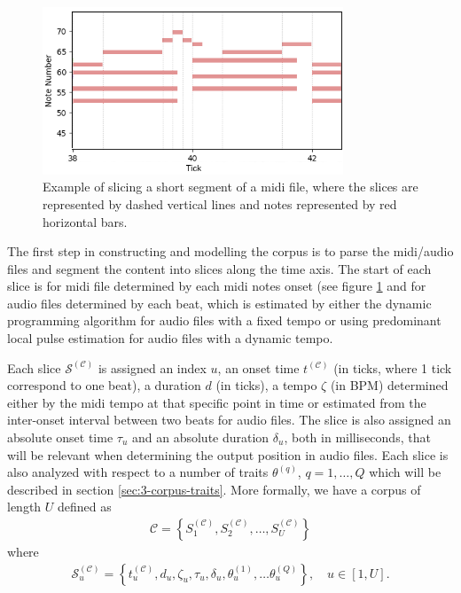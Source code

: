  \begin{figure}[h!]
    \centering        
 	\includegraphics[width=0.8\textwidth]{figures/3-slicing.png}
    \caption{Example of slicing a short segment of a midi file, where the slices are represented by dashed vertical lines and notes represented by red horizontal bars.}
    \label{fig:3-slicing}
\end{figure}

\noindent The first step in constructing and modelling the corpus is to parse the midi/audio files and segment the content into slices along the time axis. The start of each slice is for midi file determined by each midi notes onset (see figure \ref{fig:3-slicing} and for audio files determined by each beat, which is estimated by either the dynamic programming algorithm \cite{ellis_beat_2007} for audio files with a fixed tempo or using predominant local pulse estimation \cite{plp_2010} for audio files with a dynamic tempo.

Each slice $\mathcal S^{(\mathcal C)}$ is assigned an index $u$, an onset time $t^{(\mathcal C)}$ (in ticks, where 1 tick correspond to one beat), a duration $d$ (in ticks), a tempo $\zeta$ (in BPM) determined either by the midi tempo at that specific point in time or estimated from the inter-onset interval between two beats for audio files. The slice is also assigned an absolute onset time $\tau_u$ and an absolute duration $\delta_u$, both in milliseconds, that will be relevant when determining the output position in audio files. Each slice is also analyzed with respect to a number of traits $\theta^{(q)}$, $q = 1,\dots,Q$ which will be described in section \ref{sec:3-corpus-traits}. More formally, we have a corpus of length $U$ defined as 
\begin{align}
	\mathcal C = \left\lbrace S_1^{(\mathcal C)}, S_2^{(\mathcal C)}, \dots, S_U^{(\mathcal C)} \right\rbrace
 \end{align}
 where \begin{align}\label{eq:3-slice-definition}
 	\mathcal S_u^{(\mathcal C)} = \left\lbrace t_u^{(\mathcal C)}, d_u, \zeta_u, \tau_u, \delta_u, \theta_u^{(1)},\dots\theta_u^{(Q)}\right\rbrace, \quad u \in [1, U].
 \end{align}


